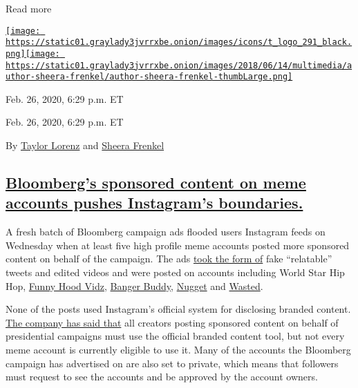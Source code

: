 Read more

\href{https://www.nytimes3xbfgragh.onion/by/taylor-lorenz}{\texttt{[image: https://static01.graylady3jvrrxbe.onion/images/icons/t\_logo\_291\_black.png]}}\href{https://www.nytimes3xbfgragh.onion/by/sheera-frenkel}{\texttt{[image: https://static01.graylady3jvrrxbe.onion/images/2018/06/14/multimedia/author-sheera-frenkel/author-sheera-frenkel-thumbLarge.png]}}

Feb. 26, 2020, 6:29 p.m. ET

Feb. 26, 2020, 6:29 p.m. ET

By \href{https://www.nytimes3xbfgragh.onion/by/taylor-lorenz}{Taylor
Lorenz} and
\href{https://www.nytimes3xbfgragh.onion/by/sheera-frenkel}{Sheera
Frenkel}

\hypertarget{bloombergs-sponsored-content-on-meme-accounts-pushes-instagrams-boundaries}{%
\subsection{\texorpdfstring{\protect\hyperlink{bloombergs-sponsored-content-on-meme-accounts-pushes-instagrams-boundaries}{Bloomberg's
sponsored content on meme accounts pushes Instagram's
boundaries.}}{Bloomberg's sponsored content on meme accounts pushes Instagram's boundaries.}}\label{bloombergs-sponsored-content-on-meme-accounts-pushes-instagrams-boundaries}}

A fresh batch of Bloomberg campaign ads flooded users Instagram feeds on
Wednesday when at least five high profile meme accounts posted more
sponsored content on behalf of the campaign. The ads
\href{https://twitter.com/TaylorLorenz/status/1232717081667391493}{took
the form of} fake ``relatable'' tweets and edited videos and were posted
on accounts including World Star Hip Hop,
\href{https://www.instagram.com/funnyhoodvidz/?hl=en}{Funny Hood Vidz},
\href{https://www.instagram.com/bangerbuddy/}{Banger Buddy},
\href{https://www.instagram.com/nugget/}{Nugget} and
\href{https://www.instagram.com/wasted/}{Wasted}.

None of the posts used Instagram's official system for disclosing
branded content.
\href{https://www.nytimes3xbfgragh.onion/2020/02/14/style/facebook-political-memes.html}{The
company has said that} all creators posting sponsored content on behalf
of presidential campaigns must use the official branded content tool,
but not every meme account is currently eligible to use it. Many of the
accounts the Bloomberg campaign has advertised on are also set to
private, which means that followers must request to see the accounts and
be approved by the account owners.

